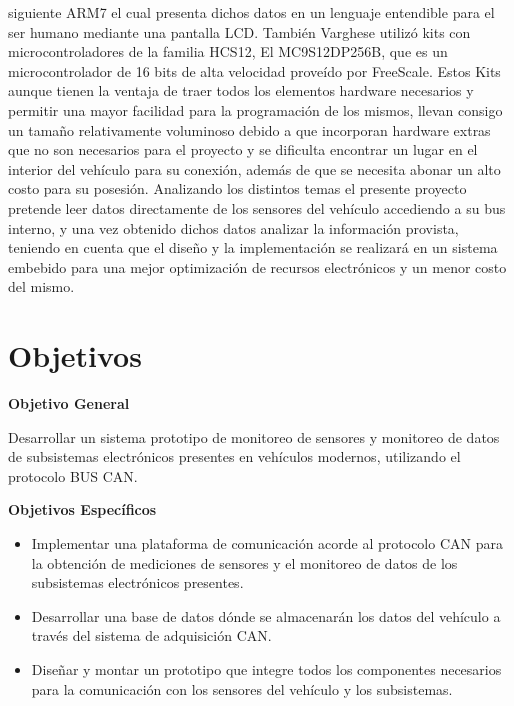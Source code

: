 siguiente ARM7 el cual presenta dichos datos en un lenguaje entendible para el ser humano mediante una pantalla LCD. También Varghese \cite{ICAN} utilizó kits con microcontroladores de la familia HCS12, El MC9S12DP256B, que es un microcontrolador de 16 bits de alta velocidad proveído por FreeScale. Estos Kits aunque tienen la ventaja de traer todos los elementos hardware necesarios y permitir una mayor facilidad para la programación de los mismos, llevan consigo un tamaño relativamente voluminoso debido a que incorporan hardware extras que no son necesarios para el proyecto y se dificulta encontrar un lugar en el interior del vehículo para su conexión, además de que se necesita abonar un alto costo para su posesión. Analizando los distintos temas el presente proyecto pretende leer datos directamente de los sensores del vehículo accediendo a su bus interno, y una vez obtenido dichos datos analizar la información provista, teniendo en cuenta que el diseño y la implementación se realizará en un sistema embebido para una mejor optimización de recursos electrónicos y un menor costo del mismo.

 
 


\newpage

\section{Objetivos}


\begin{center}
\textbf{Objetivo General}
\end{center}
Desarrollar un sistema prototipo de monitoreo de sensores y monitoreo de datos de subsistemas electrónicos presentes en vehículos modernos, utilizando el protocolo BUS CAN.
\begin{center}
\textbf{Objetivos Específicos}
\end{center}

\begin{itemize}
	\item	Implementar una plataforma de comunicación acorde al protocolo CAN para la obtención de mediciones de sensores y el monitoreo de datos de los subsistemas electrónicos presentes.
	
	\item Desarrollar una base de datos dónde se almacenarán los datos del vehículo a través del sistema de adquisición CAN.
	
	\item Diseñar y montar un prototipo que integre todos los componentes necesarios para la comunicación con los sensores del vehículo y los subsistemas.
	
		
\end{itemize}

